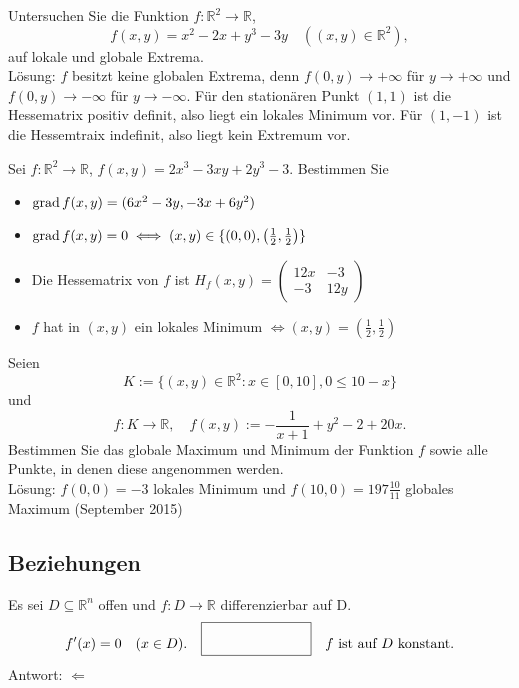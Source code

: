 Untersuchen Sie die Funktion $f : \mathbb{R}^2 \to \mathbb{R}$,
\begin{displaymath}
  f(x,y) = x^2 - 2x + y^3 - 3y \quad ((x,y) \in \mathbb{R}^2),
\end{displaymath}
auf lokale und globale Extrema.\\
Lösung:
$f$ besitzt keine globalen Extrema, denn $f(0,y) \to +\infty$ für $y \to +\infty$ und $f(0,y) \to -\infty$ für $y \to -\infty$.
Für den stationären Punkt $(1,1)$ ist die Hessematrix positiv definit, also liegt ein lokales Minimum vor.
Für $(1,-1)$ ist die Hessemtraix indefinit, also liegt kein Extremum vor.

Sei $f : \mathbb{R}^2 \to \mathbb{R}$, $f(x,y) = 2x^3 - 3xy + 2y^3 - 3$.
Bestimmen Sie
\begin{itemize}
    \item $\operatorname{grad} f(x,y) = (6x^2 - 3y, -3x + 6y^2)$
    \item $\operatorname{grad} f(x,y) = 0 \iff (x,y) \in \{(0,0), \left(\frac{1}{2}, \frac{1}{2}\right)\}$
    \item Die Hessematrix von $f$ ist $H_f(x,y) = \begin{pmatrix} 12x & -3\\-3 & 12y\end{pmatrix}$
    \item $f$ hat in $(x,y)$ ein lokales Minimum $\iff (x,y) = \left(\frac{1}{2}, \frac{1}{2}\right)$
\end{itemize}

Seien
\begin{displaymath}
  K := \{(x,y) \in \mathbb{R}^2 : x\in [0,10], 0 \leq 10 - x\}
\end{displaymath}
und
\begin{displaymath}
  f : K \to \mathbb{R}, \quad f(x,y) := - \frac{1}{x + 1} + y^2 - 2 + 20x.
\end{displaymath}
Bestimmen Sie das globale Maximum und Minimum der Funktion $f$ sowie alle Punkte, in denen diese angenommen werden.\\
Lösung:
$f(0,0) = -3$ lokales Minimum und $f(10,0) = 197 \frac{10}{11}$ globales Maximum
(September 2015)

\subsection{Beziehungen}
Es sei $D \subseteq \mathbb{R}^n$ offen und $f : D \to \mathbb{R}$ differenzierbar auf D.
\begin{displaymath}
  f'(x) = 0 \quad (x \in D). \quad \fbox{\rule{1in}{0pt}\rule[-0.5ex]{0pt}{4ex}} \quad f \text{ ist auf } D \text{ konstant}.
\end{displaymath}
Antwort: $\Leftarrow$

